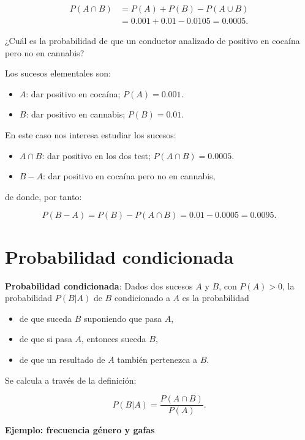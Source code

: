 \documentclass[]{book}
\providecommand{\tightlist}{%
  \setlength{\itemsep}{0pt}\setlength{\parskip}{0pt}}
\begin{document}
\[\begin{array}{rl}
{P(A\cap B)} &{=P(A)+P(B)-P(A\cup B)}\\ &{=0.001+0.01-0.0105=0.0005}.
\end{array}\]

¿Cuál es la probabilidad de que un conductor analizado de positivo en cocaína pero no en cannabis?

Los sucesos elementales son:

\begin{itemize}
\tightlist
\item
  \(A\): dar positivo en cocaína; \(P(A)=0.001\).
\item
  \(B\): dar positivo en cannabis; \(P(B)=0.01\).
\end{itemize}

En este caso nos interesa estudiar los sucesos:

\begin{itemize}
\tightlist
\item
  \(A\cap B\): dar positivo en los dos test; \(P(A\cap B)=0.0005\).
\item
  \(B-A\): dar positivo en cocaína pero no en cannabis,
\end{itemize}

de donde, por tanto:

\[P(B-A) =P(B)-P(A\cap B) =0.01-0.0005=0.0095.\]

\hypertarget{probabilidad-condicionada}{%
\section{Probabilidad condicionada}\label{probabilidad-condicionada}}

\textbf{Probabilidad condicionada}: Dados dos sucesos \(A\) y \(B\), con \(P(A)>0\), la probabilidad \(P(B|A)\) de \(B\) condicionado a \(A\) es la probabilidad

\begin{itemize}
\tightlist
\item
  de que suceda \(B\) suponiendo que pasa \(A\),
\item
  de que si pasa \(A\), entonces suceda \(B\),
\item
  de que un resultado de \(A\) también pertenezca a \(B\).
\end{itemize}

Se calcula a través de la definición:

\[
P(B|A)=\frac{P(A\cap B)}{P(A)}.
\]

\textbf{Ejemplo: frecuencia género y gafas}
\end{document}

